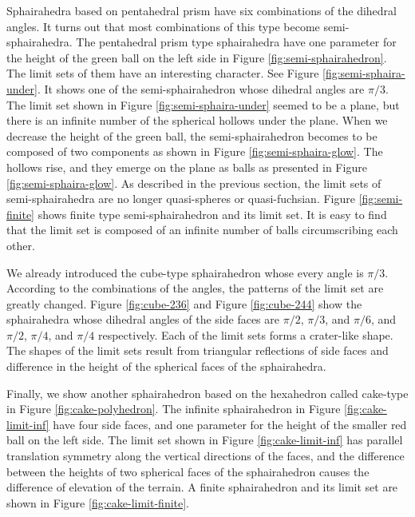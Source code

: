Sphairahedra based on pentahedral prism have six combinations of the
dihedral angles.
It turns out that most combinations of this type become
semi-sphairahedra.
The pentahedral prism type sphairahedra have one parameter for the
height of the green ball on the left side in Figure
\ref{fig:semi-sphairahedron}.
The limit sets of them have an interesting character.
See Figure \ref{fig:semi-sphaira-under}.
It shows one of the semi-sphairahedron whose dihedral angles are $\pi / 3$.
The limit set shown in Figure
\ref{fig:semi-sphaira-under} seemed
to be a plane, but there is an infinite number of the spherical hollows
under the plane.
When we decrease the height of the green ball, the semi-sphairahedron
becomes to be composed of two components as shown in Figure
\ref{fig:semi-sphaira-glow}.
The hollows rise, and they emerge on the plane as balls
as presented in Figure
\ref{fig:semi-sphaira-glow}.
As described in the previous section, the limit sets of semi-sphairahedra
are no longer quasi-spheres or quasi-fuchsian.
Figure \ref{fig:semi-finite} shows finite type semi-sphairahedron
and its limit set.
It is easy to find that the limit set is composed of an infinite number
of balls circumscribing each other.

We already introduced the cube-type sphairahedron whose every angle is
$\pi / 3$.
According to the combinations of the angles, the patterns of the limit
set are greatly changed.
Figure \ref{fig:cube-236} and Figure \ref{fig:cube-244} show the
sphairahedra whose dihedral angles of the side faces are
$\pi / 2$, $\pi / 3$, and $\pi / 6$,
and $\pi / 2$, $\pi / 4$, and $\pi / 4$ respectively.
Each of the limit sets forms a crater-like shape.
The shapes of the limit sets result from triangular reflections of side faces and
difference in the height of the spherical faces of the sphairahedra.

Finally, we show another sphairahedron based on the hexahedron
called cake-type in Figure \ref{fig:cake-polyhedron}.
The infinite sphairahedron in
Figure \ref{fig:cake-limit-inf}
have four side faces, and one parameter for the height of the smaller
red ball on the left side.
The limit set shown in
Figure \ref{fig:cake-limit-inf} has parallel
translation symmetry along the vertical directions of the faces, and the
difference between the heights of two spherical faces of the
sphairahedron causes the difference of elevation of the terrain.
A finite sphairahedron and its limit set are shown in Figure
\ref{fig:cake-limit-finite}.

